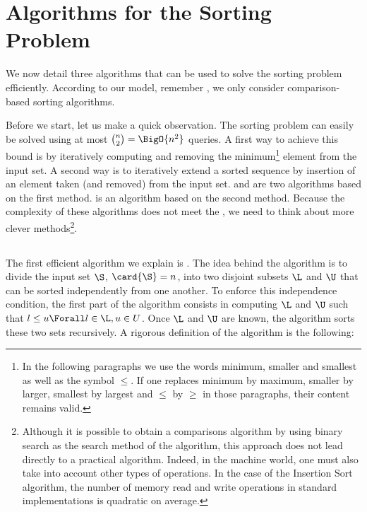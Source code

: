 \section{Algorithms for the Sorting Problem}
\label{tree:sorting:alg}

We now detail three algorithms that can be used to solve the sorting
problem efficiently. According to our model, remember ,
we only consider comparison-based sorting algorithms.

Before we start, let us make a quick observation. The sorting problem can
easily be solved using at most \(\binom{n}{2} = \BigO{n^2}\) queries. A first
way to achieve this bound is by iteratively computing and removing the
minimum\footnote{In the following paragraphs we use the words minimum,
smaller
and smallest as well as the symbol \(\le\). If one replaces minimum by maximum,
smaller by larger, smallest by largest and \(\le\) by \(\ge\) in those paragraphs,
their content remains valid.}
element from the input set. A second way is to iteratively
extend a sorted sequence by insertion of an element taken (and removed) from
the input set. \selectionsort and \bubblesort are two algorithms based on the
first method. \insertionsort is an algorithm based on the second method.
Because the complexity of these algorithms does not meet the \ITLB, we need
to think about more clever methods\footnote{Although it is possible to obtain
a  comparisons algorithm by using binary search as the search
method of the \insertionsort algorithm, this approach does not lead directly to
a practical algorithm. Indeed, in the machine world, one must also take into
account other types of operations. In the case of the Insertion Sort algorithm,
the number of memory read and write operations in standard implementations is
quadratic on average.}.

\subsection{\quicksort}
The first efficient algorithm we explain is \quicksort \cite{hoare:1962}.
The idea behind the \quicksort algorithm is to divide the input set \(\S\),
\(\card{\S} = n\), into two disjoint subsets \(\L\) and \(\U\) that can be
sorted independently from one another. To enforce this independence condition,
the first part of the algorithm consists in computing \(\L\) and \(\U\) such
that \(l \le u \Forall l \in \L, u \in U\). Once \(\L\) and \(\U\) are known,
the algorithm sorts these two sets recursively. A rigorous definition of the
algorithm is the following:

